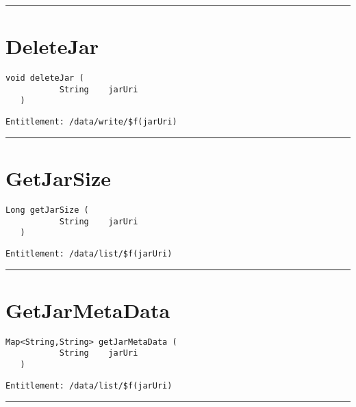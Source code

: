 \rule{12cm}{2pt}
\section{DeleteJar}
\label{Api:DeleteJar}
\begin{lstlisting}[style=nonumbers]
   void deleteJar (
           String    jarUri
   )
\end{lstlisting}
\begin{Verbatim}[formatcom=\color{Maroon}]
  Entitlement: /data/write/$f(jarUri)
\end{Verbatim}



\rule{12cm}{2pt}
\section{GetJarSize}
\label{Api:GetJarSize}
\begin{lstlisting}[style=nonumbers]
   Long getJarSize (
           String    jarUri
   )
\end{lstlisting}
\begin{Verbatim}[formatcom=\color{Maroon}]
  Entitlement: /data/list/$f(jarUri)
\end{Verbatim}



\rule{12cm}{2pt}
\section{GetJarMetaData}
\label{Api:GetJarMetaData}
\begin{lstlisting}[style=nonumbers]
   Map<String,String> getJarMetaData (
           String    jarUri
   )
\end{lstlisting}
\begin{Verbatim}[formatcom=\color{Maroon}]
  Entitlement: /data/list/$f(jarUri)
\end{Verbatim}



\rule{12cm}{2pt}
